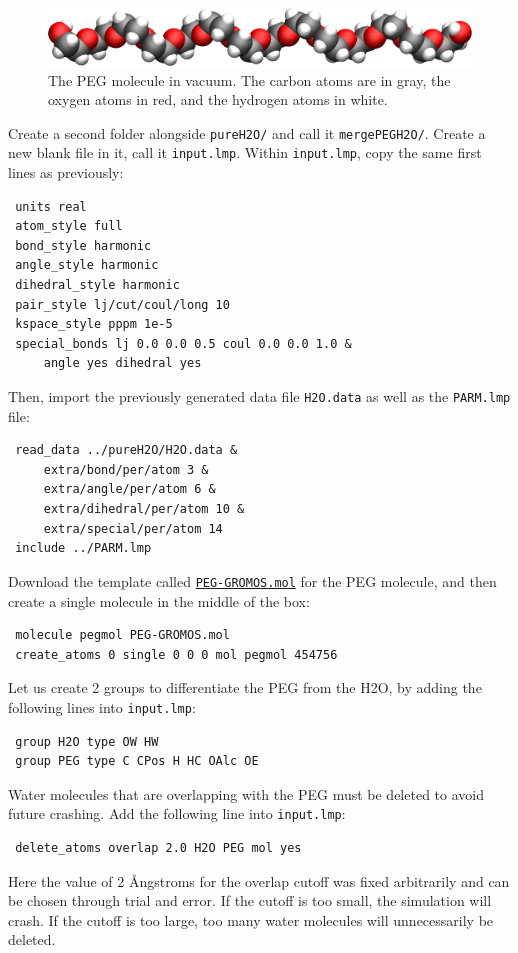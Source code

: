 \documentclass[9pt,tutorial]{livecoms}
\newcommand{\flrcmd}[1]{\textcolor{command}{\texttt{#1}}} %
\newcommand{\flecmd}[1]{\textcolor{command}{\texttt{#1}}} %
\newcommand{\dwlcmd}[1]{\textcolor{download}{\texttt{#1}}} %
\newcommand{\filepath}{https://raw.githubusercontent.com/lammpstutorials/lammpstutorials-article/main/files/}
\begin{document}
\begin{figure}
\centering
\includegraphics[width=\linewidth]{PEG-in-vacuum}
\caption{The PEG molecule in vacuum. The carbon atoms are in gray, the oxygen
atoms in red, and the hydrogen atoms in white.}
\label{fig:PEG-in-vacuum}
\end{figure}

Create a second folder alongside \flrcmd{pureH2O/} and call it \flrcmd{mergePEGH2O/}.
Create a new blank file in it, call it \flecmd{input.lmp}. Within \flecmd{input.lmp},
copy the same first lines as previously:
\begin{lstlisting}
 units real
 atom_style full
 bond_style harmonic
 angle_style harmonic
 dihedral_style harmonic
 pair_style lj/cut/coul/long 10
 kspace_style pppm 1e-5
 special_bonds lj 0.0 0.0 0.5 coul 0.0 0.0 1.0 &
     angle yes dihedral yes
\end{lstlisting}
Then, import the previously generated data file \flecmd{H2O.data} as well as the \flecmd{PARM.lmp} file:
\begin{lstlisting}
 read_data ../pureH2O/H2O.data &
     extra/bond/per/atom 3 &
     extra/angle/per/atom 6 &
     extra/dihedral/per/atom 10 &
     extra/special/per/atom 14
 include ../PARM.lmp
\end{lstlisting}
Download the template called
\href{\filepath tutorial3/mergePEGH2O/PEG-GROMOS.mol}{\dwlcmd{PEG-GROMOS.mol}}
for the PEG molecule, and then create a single molecule in the middle of the box:
\begin{lstlisting}
 molecule pegmol PEG-GROMOS.mol
 create_atoms 0 single 0 0 0 mol pegmol 454756
\end{lstlisting}
Let us create 2 groups to differentiate the PEG from the H2O, by adding the following
lines into \flecmd{input.lmp}:
\begin{lstlisting}
 group H2O type OW HW
 group PEG type C CPos H HC OAlc OE
\end{lstlisting}
Water molecules that are overlapping with the PEG must be deleted to avoid future crashing.
Add the following line into \flecmd{input.lmp}:
\begin{lstlisting}
 delete_atoms overlap 2.0 H2O PEG mol yes
\end{lstlisting}
Here the value of 2 Ångstroms for the overlap cutoff was fixed arbitrarily and can
be chosen through trial and error. If the cutoff is too small, the simulation will
crash. If the cutoff is too large, too many water molecules will unnecessarily be
deleted.
\end{document}

